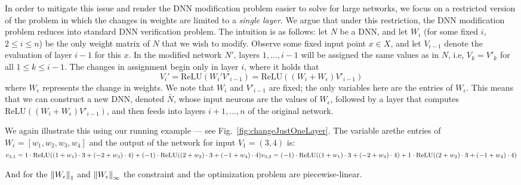 \documentclass{easychair}
\newcommand{\relu}{\text{ReLU}\xspace{}}
\begin{document}
In order to mitigate this issue and render the DNN modification problem easier to
solve for large networks, we focus on a restricted version of
the problem in which the changes in weights are
limited to a \emph{single layer}. We argue that under this
restriction, the DNN modification problem reduces into standard DNN
verification problem. The intuition is as follows: let $N$ be a DNN,
and let $W_i$ (for some fixed $i$, $2\leq i\leq n$) be the only weight matrix of $N$ that
we wish to modify. Observe some fixed input point $x\in X$, and let
$V_{i-1}$ denote the evaluation of layer $i-1$ for this $x$. In the
modified network $N'$, layers $1,\ldots,i-1$ will be assigned the same
values as in $N$, i.e, $V_k=V'_k$ for all $1\leq k\leq i-1$. The
changes in assignment begin only in layer $i$, where it holds that
\[
  V_i' = \relu{}(W_i'V'_{i-1}) = \relu{}((W_i+W_\epsilon)V'_{i-1})
\]
where $W_\epsilon$ represents the change in weights. We note that
$W_i$ and $V'_{i-1}$ are fixed; the only variables here are the
entries of $W_\epsilon$. This means that we can construct a new DNN,
denoted $\bar{N}$, whose input neurons are the values of $W_\epsilon$,
followed by a layer that computes $\relu{}((W_i+W_\epsilon)V'_{i-1})$,
and then feeds into layers $i+1,\ldots,n$ of the original network.


We again illustrate this using our running example --- see
Fig.~\ref{fig:changeJustOneLayer}. The variable arethe entries of $W_\epsilon=[w_1,w_2,w_3,w_4]$ and the output of the network for input $V_1=(3,4)$ is:
\\
\begin{math}
v_{3,1}=1\cdot\relu{}((1+w_1)\cdot 3+(-2+w_3)\cdot 4)+(-1)\cdot\relu{}((2+w_2)\cdot 3+(-1+w_4)\cdot 4)\\
v_{3,2}=(-1)\cdot\relu{}((1+w_1)\cdot 3+(-2+w_3)\cdot 4)+1\cdot\relu{}((2+w_2)\cdot 3+(-1+w_4)\cdot 4)
\end{math}

And for the $\left\lVert W_\epsilon\right\rVert_1$ and $\left\lVert W_\epsilon\right\rVert_\infty$ the constraint and the optimization problem are piecewise-linear. 
\end{document}
